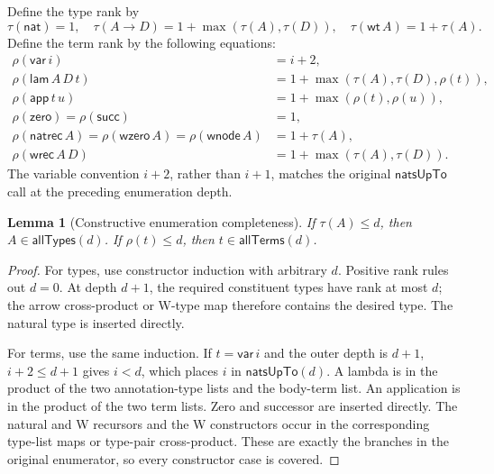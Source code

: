 \documentclass[11pt,letterpaper]{article}
\newtheorem{lemma}[theorem]{Lemma}
\theoremstyle{definition}
\begin{document}
Define the type rank by
\[
 \tau(\mathsf{nat})=1,\quad
 \tau(A\to D)=1+\max(\tau(A),\tau(D)),\quad
 \tau(\mathsf{wt}\,A)=1+\tau(A).
\]
Define the term rank by the following equations:
\begin{align*}
 \rho(\mathsf{var}\,i)&=i+2,\\
 \rho(\mathsf{lam}\,A\,D\,t)&=1+\max(\tau(A),\tau(D),\rho(t)),\\
 \rho(\mathsf{app}\,t\,u)&=1+\max(\rho(t),\rho(u)),\\
 \rho(\mathsf{zero})=\rho(\mathsf{succ})&=1,\\
 \rho(\mathsf{natrec}\,A)=\rho(\mathsf{wzero}\,A)
   =\rho(\mathsf{wnode}\,A)&=1+\tau(A),\\
 \rho(\mathsf{wrec}\,A\,D)&=1+\max(\tau(A),\tau(D)).
\end{align*}
The variable convention $i+2$, rather than $i+1$, matches the original
$\mathsf{natsUpTo}$ call at the preceding enumeration depth.

\begin{lemma}[Constructive enumeration completeness]
\label{lem:enum}
If $\tau(A)\le d$, then $A\in\mathsf{allTypes}(d)$. If $\rho(t)\le d$, then
$t\in\mathsf{allTerms}(d)$.
\end{lemma}
\begin{proof}
For types, use constructor induction with arbitrary $d$. Positive rank rules
out $d=0$. At depth $d+1$, the required constituent types have rank at most
$d$; the arrow cross-product or W-type map therefore contains the desired
type. The natural type is inserted directly.

For terms, use the same induction. If $t=\mathsf{var}\,i$ and the outer depth
is $d+1$, $i+2\le d+1$ gives $i<d$, which places $i$ in
$\mathsf{natsUpTo}(d)$. A lambda is in the product of the two annotation-type
lists and the body-term list. An application is in the product of the two
term lists. Zero and successor are inserted directly. The natural and W
recursors and the W constructors occur in the corresponding type-list maps
or type-pair cross-product. These are exactly the branches in the original
enumerator, so every constructor case is covered.
\end{proof}
\end{document}
